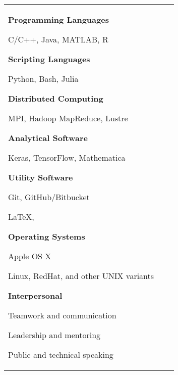 \begin{tabular}[t]{@{}p{\textwidth-\rcollength-3.5\spacewidth}@{}p{\spacewidth}@{}p{\rcollength}}
\parbox{\textwidth-\rcollength-\spacewidth}{%
\textbf{Programming Languages}
\begin{innerlist}
	\item[] C/C++, Java, MATLAB, R
\end{innerlist}
%
\textbf{Scripting Languages}
\begin{innerlist}
	\item[] Python, Bash, Julia
\end{innerlist}
%
\textbf{Distributed Computing}
\begin{innerlist}
	\item[] MPI, Hadoop MapReduce, Lustre
\end{innerlist}
%
\textbf{Analytical Software}
\begin{innerlist}
	\item[] Keras, TensorFlow, Mathematica
\end{innerlist}
%
\textbf{Utility Software}
\begin{innerlist}
	\item[] Git, GitHub/Bitbucket
	\item[] \LaTeX{}, \BibTeX
\end{innerlist}
%
\textbf{Operating Systems}
\begin{innerlist}
    \item[] Apple OS X
    \item[] Linux, RedHat, and other UNIX variants
\end{innerlist}
%
\textbf{Interpersonal}
\begin{innerlist}
	\item[] Teamwork and communication
	\item[] Leadership and mentoring
	\item[] Public and technical speaking
\end{innerlist}
}


\end{tabular}